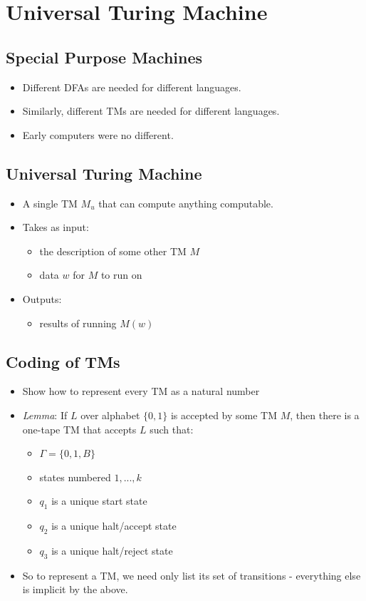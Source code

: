 \documentclass[12pt]{article}
\begin{document}
\section{Universal Turing Machine}

\subsection{Special Purpose Machines}
\begin{itemize}
    \item Different DFAs are needed for different languages.
    \item Similarly, different TMs are needed for different languages.
    \item Early computers were no different.
\end{itemize}

\subsection{Universal Turing Machine}
\begin{itemize}
    \item A single TM $M_u$ that can compute anything computable.
    \item Takes as input:
    \begin{itemize}
        \item the description of some other TM $M$
        \item data $w$ for $M$ to run on
    \end{itemize}
    \item Outputs:
    \begin{itemize}
        \item results of running $M(w)$
    \end{itemize}
\end{itemize}

\subsection{Coding of TMs}
\begin{itemize}
    \item Show how to represent every TM as a natural number
    \item \textit{Lemma}: If $L$ over alphabet $\{ 0, 1 \}$ is accepted by some TM $M$, then there is a one-tape TM that accepts $L$ such that:
    \begin{itemize}
        \item $\Gamma = \{ 0, 1, B \}$
        \item states numbered $1, ..., k$
        \item $q_1$ is a unique start state
        \item $q_2$ is a unique halt/accept state
        \item $q_3$ is a unique halt/reject state
    \end{itemize}
    \item So to represent a TM, we need only list its set of transitions - everything else is implicit by the above.
\end{itemize}
\end{document}
